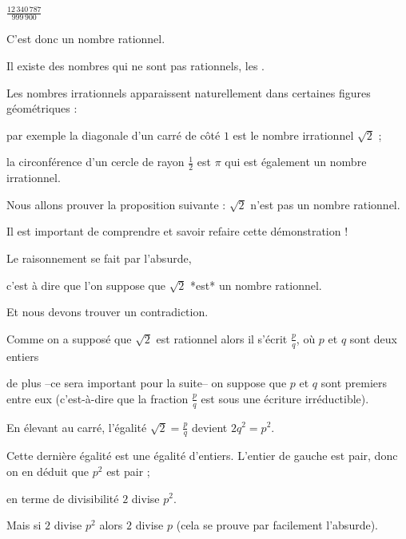 $\frac{12\,340\,787}{999\,900}$

C'est donc un nombre rationnel.


\diapo

Il existe des nombres qui ne sont pas rationnels, les .

Les nombres irrationnels apparaissent naturellement dans certaines figures géométriques :

par exemple la diagonale d'un carré de côté $1$ est le nombre irrationnel $\sqrt{2}$ ;

\change

la circonférence d'un cercle de rayon $\frac12$ est $\pi$ qui est également un nombre irrationnel.


\diapo

Nous allons prouver la proposition suivante : $\sqrt{2}$ n'est pas un nombre rationnel.

\change

Il est important de comprendre et savoir refaire cette démonstration !

\change

Le raisonnement se fait par l'absurde, 

c'est à dire que l'on suppose que $\sqrt2$ *est* un nombre rationnel.

Et nous devons trouver un contradiction.

\change

Comme on a supposé que $\sqrt2$ est rationnel alors il s'écrit
$\frac pq$, où $p$ et $q$ sont deux entiers

\change


de plus --ce sera important pour la suite-- 
on suppose que $p$ et $q$ sont premiers entre eux
(c'est-à-dire que la fraction $\frac pq$ est sous une écriture irréductible).

\change

En élevant au carré, l'égalité  $\sqrt{2}=\frac pq$ devient $2q^2=p^2$.


Cette dernière égalité est une égalité d'entiers. L'entier de gauche est pair, 
donc on en déduit que
$p^2$ est pair ; 

\change

en terme de divisibilité  $2$ divise $p^2$.

\change

Mais si $2$ divise $p^2$ alors $2$ divise $p$ (cela se prouve par facilement l'absurde).

